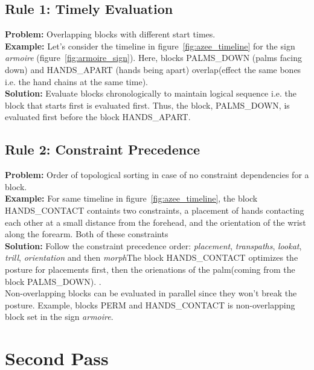 \documentclass[../../main.tex]{subfiles}
\begin{document}
\subsection{Rule 1: Timely Evaluation}
\label{ch:multi_track:resolve_conflitcs:rule1}

\textbf{Problem:} Overlapping blocks with different start times. \\

\textbf{Example:} Let's consider the timeline in figure~\ref{fig:azee_timeline} for the sign \emph{armoire} (figure~\ref{fig:armoire_sign}). Here, blocks PALMS\_DOWN (palms facing down) and HANDS\_APART (hands being apart) overlap(effect the same bones i.e. the hand chains at the same time).  \\

\textbf{Solution:} Evaluate blocks chronologically to maintain logical sequence i.e. the block that starts first is evaluated first. Thus, the block, PALMS\_DOWN, is evaluated first before the block HANDS\_APART.  \\

\subsection{Rule 2: Constraint Precedence}
\label{ch:multi_track:resolve_conflitcs:rule2}

\textbf{Problem:} Order of topological sorting in case of no constraint dependencies for a block. \\

\textbf{Example:} For same timeline in figure~\ref{fig:azee_timeline}, the block HANDS\_CONTACT containts two constraints, a placement of hands contacting each other at a small distance from the forehead, and the orientation of the wrist along the forearm. Both of these constraints \\

\textbf{Solution:} Follow the constraint precedence order: \emph{placement}, \emph{transpaths}, \emph{lookat}, \emph{trill}, \emph{orientation} and then \emph{morph}The block HANDS\_CONTACT optimizes the posture for placements first, then the orienations of the palm(coming from the block PALMS\_DOWN). . \\

Non-overlapping blocks can be evaluated in parallel since they won't break the posture. Example, blocks PERM and HANDS\_CONTACT is non-overlapping block set in the sign \emph{armoire}.

\section{Second Pass}
\label{ch:multi_track:second_pass}
\end{document}
